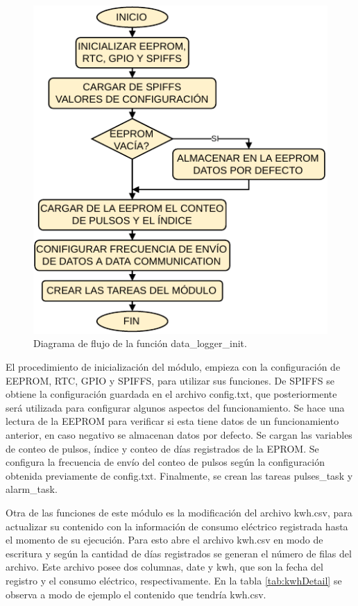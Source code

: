 \begin{figure}[h]
	\centering
	\includegraphics[scale=1]{./Figures/data_logger_init.pdf}
	\caption{Diagrama de flujo de la función data\_logger\_init.}
		\label{fig:flowDataInit}
\end{figure}

El procedimiento de inicialización del módulo, empieza con la configuración de EEPROM, RTC, GPIO y SPIFFS, para utilizar sus funciones. De SPIFFS se obtiene la configuración guardada en el archivo config.txt, que posteriormente será utilizada para configurar algunos aspectos del funcionamiento. Se hace una lectura de la EEPROM para verificar si esta tiene datos de un funcionamiento anterior, en caso negativo se almacenan datos por defecto. Se cargan las variables de conteo de pulsos, índice y conteo de días registrados de la EPROM. Se configura la frecuencia de envío del conteo de pulsos según la configuración obtenida previamente de config.txt. Finalmente, se crean las tareas pulses\_task y alarm\_task.

Otra de las funciones de este módulo es la modificación del archivo kwh.csv, para actualizar su contenido con la información de consumo eléctrico registrada hasta el momento de su ejecución. Para esto abre el archivo kwh.csv en modo de escritura y según la cantidad de días registrados se generan el número de filas del archivo. Este archivo posee dos columnas, date y kwh, que son la fecha del registro y el consumo eléctrico, respectivamente. En la tabla \ref{tab:kwhDetail} se observa a modo de ejemplo el contenido que tendría kwh.csv.

